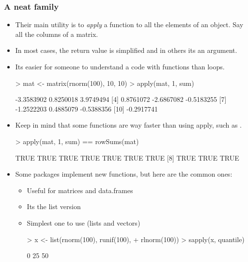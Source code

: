 \begin{frame}
  \frametitle{A neat family}
  \begin{itemize}
  \item Their main utility is to \emph{apply} a function to all the elements of an object. Say all the columns of a matrix.
  \item In most cases, the return value is simplified and in others its an argument.
  \item Its easier for someone to understand a code with  functions than  loops.
\begin{Schunk}
\begin{Sinput}
> mat <- matrix(rnorm(100), 10, 10)
> apply(mat, 1, sum)
\end{Sinput}
\begin{Soutput}
 [1] -3.3583902  0.8250018  3.9749494
 [4]  0.8761072 -2.6867082 -0.5183255
 [7] -1.2522203  0.4885079 -0.5388356
[10] -0.2917741
\end{Soutput}
\end{Schunk}
  \item Keep in mind that some  functions are way faster than using apply, such as .
\begin{Schunk}
\begin{Sinput}
> apply(mat, 1, sum) == rowSums(mat)
\end{Sinput}
\begin{Soutput}
 [1] TRUE TRUE TRUE TRUE TRUE TRUE TRUE
 [8] TRUE TRUE TRUE
\end{Soutput}
\end{Schunk}
  \item Some packages implement new  functions, but here are the common ones:
  \begin{itemize}
  \item {} Useful for matrices and data.frames
  \item {} Its the list version
  \item {} Simplest one to use (lists and vectors)
\begin{Schunk}
\begin{Sinput}
> x <- list(rnorm(100), runif(100), 
+     rlnorm(100))
> sapply(x, quantile)
\end{Sinput}
\begin{Soutput}
           [,1]       [,2]       [,3]
0%
25%
50%

\end{Soutput}
\end{Schunk}
\end{itemize}
\end{itemize}
\end{frame}
